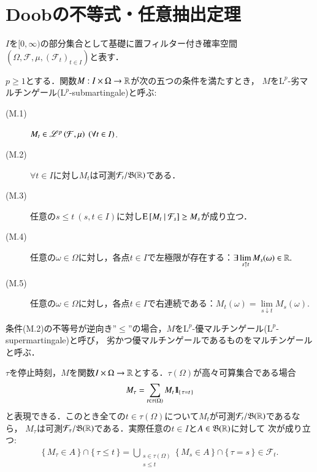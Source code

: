 \section{Doobの不等式・任意抽出定理}
	$I$を$[0,\infty)$の部分集合として基礎に置フィルター付き確率空間$(\Omega,\mathcal{F},\mu,(\mathcal{F}_t)_{t \in I})$と表す．
	\begin{screen}
		\begin{dfn}[マルチンゲール]
			$p \geq 1$とする．関数$M:I \times \Omega \rightarrow \mathbb{R}$が次の五つの条件を満たすとき，
			$M$を$\mathrm{L}^p$-劣マルチンゲール($\mathrm{L}^p$-submartingale)と呼ぶ:
			\begin{description}
				\item[(M.1)] $M_t \in \semiLp{p}{\mathcal{F},\mu}\ (\forall t \in I)$.
				\item[(M.2)] $\forall t \in I$に対し$M_t$は可測$\mathcal{F}_t/\mathfrak{B}(\mathbb{R})$である．
				\item[(M.3)] 任意の$s \leq t\ (s,t \in I)$に対し$\operatorname{E} \left[ M_t \ \middle|\ \mathcal{F}_s \right] \geq M_s$が成り立つ．
				\item[(M.4)] 任意の$\omega \in \Omega$に対し，各点$t \in I$で左極限が存在する：$\exists \lim\limits_{s \uparrow t} M_s(\omega) \in \mathbb{R}.$
				\item[(M.5)] 任意の$\omega \in \Omega$に対し，各点$t \in I$で右連続である：$M_t(\omega) = \lim\limits_{s \downarrow t} M_s(\omega).$
			\end{description}
			条件(M.2)の不等号が逆向き''$\leq$''の場合，$M$を$\mathrm{L}^p$-優マルチンゲール($\mathrm{L}^p$-supermartingale)と呼び，
			劣かつ優マルチンゲールであるものをマルチンゲールと呼ぶ．
			\label{dfn:martingale}
		\end{dfn}
	\end{screen}
	
	$\tau$を停止時刻，$M$を関数$I \times \Omega \rightarrow \mathbb{R}$とする．$\tau(\Omega)$が高々可算集合である場合
	\begin{align}
		M_\tau = \sum_{t \in \tau(\Omega)}M_t \mbox{1}\hspace{-0.25em}\mbox{l}_{\{\, \tau = t\, \}}
	\end{align}
	と表現できる．このとき全ての$t \in \tau(\Omega)$について$M_t$が可測$\mathcal{F}_t/\mathfrak{B}(\mathbb{R})$であるなら，
	$M_\tau$は可測$\mathcal{F}_\tau/\mathfrak{B}(\mathbb{R})$である．実際任意の$t \in I$と$A \in \mathfrak{B}(\mathbb{R})$に対して
	次が成り立つ:
	\begin{align}
		\{\, M_\tau \in A\, \} \cap \{\, \tau \leq t\, \}
		= \bigcup_{\substack{s \in \tau(\Omega) \\ s \leq t}}\{\, M_s \in A\, \} \cap \{\, \tau = s\, \} \in \mathcal{F}_t.
	\end{align}
	
